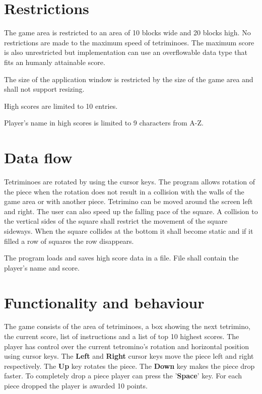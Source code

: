 \documentclass[11pt,a4paper]{article}
\begin{document}
\section {Restrictions}

The game area is restricted to an area of 10 blocks wide and 20 blocks high. No restrictions
are made to the maximum speed of tetriminoes. The maximum score is also unrestricted but
implementation can use an overflowable data type that fits an humanly attainable score.

The size of the application window is restricted by the size of the game area and shall
not support resizing.

High scores are limited to 10 entries.

Player's name in high scores is limited to 9 characters from A-Z.

\section {Data flow}

Tetriminoes are rotated by using the cursor keys. The program allows rotation 
of the piece when the rotation does not result in a collision with the walls of the game
area or with another piece. Tetrimino can be moved around the screen left and right. The
user can also speed up the falling pace of the square. A collision to the vertical sides
of the square shall restrict the movement of the square sideways. When the square collides
at the bottom it shall become static and if it filled a row of squares the row disappears.

The program loads and saves high score data in a file. File shall contain
the player's name and score.

\section {Functionality and behaviour}

The game consists of the area of tetriminoes, a box showing the next tetrimino, the current
score, list of instructions and a list of top 10 highest scores. 
The player has control over the current tetromino's rotation and horizontal position using cursor keys. The {\bf Left} and
{\bf Right} cursor keys move the piece left and right respectively. The {\bf Up} key rotates the piece. The {\bf Down} key makes the piece drop faster. To completely drop a piece player can press the '{\bf Space}' key. For each piece dropped the player is awarded 10 points.
\end{document}
